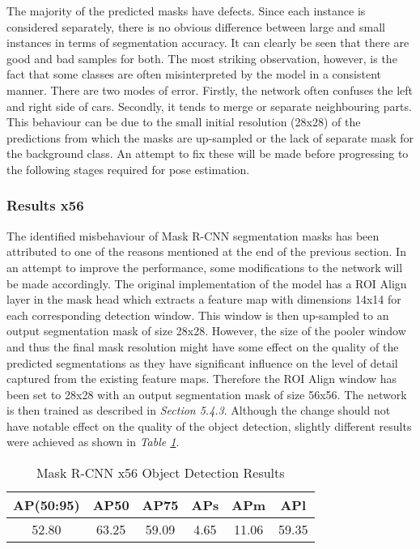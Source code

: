 \documentclass[main.tex]{subfiles}
\begin{document}
\indent The majority of the predicted masks have defects. Since each instance is considered separately, there is no obvious difference between large and small instances in terms of segmentation accuracy. It can clearly be seen that there are good and bad samples for both. The most striking observation, however, is the fact that some classes are often misinterpreted by the model in a consistent manner. There are two modes of error. Firstly, the network often confuses the left and right side of cars. Secondly, it tends to merge or separate neighbouring parts. This behaviour can be due to the small initial resolution (28x28) of the predictions from which the masks are up-sampled or the lack of separate mask for the background class. An attempt to fix these will be made before progressing to the following stages required for pose estimation.
\subsubsection{Results x56}
The identified misbehaviour of Mask R-CNN segmentation masks has been attributed to one of the reasons mentioned at the end of the previous section. In an attempt to improve the performance, some modifications to the network will be made accordingly. The original implementation of the model has a ROI Align layer in the mask head which extracts a feature map with dimensions 14x14 for each corresponding detection window. This window is then up-sampled to an output segmentation mask of size 28x28. However, the size of the pooler window and thus the final mask resolution might have some effect on the quality of the predicted segmentations as they have significant influence on the level of detail captured from the existing feature maps. Therefore the ROI Align window has been set to 28x28 with an output segmentation mask of size 56x56. The network is then trained as described in \emph{Section 5.4.3}. Although the change should not have notable effect on the quality of the object detection, slightly different results were achieved as shown in \emph{Table \ref{tab:mrcnn_obj_resultsx56}}.
\begin{table}[H]
	\centering
	\begin{tabular}{| c | c | c | c | c | c |}
		\hline 
  		AP(50:95) & AP50 & AP75 & APs & APm & APl  \\
  		\hline
   		52.80 & 63.25 & 59.09 & 4.65 & 11.06 & 59.35 \\
		\hline
	\end{tabular}	
\caption{Mask R-CNN x56 Object Detection Results}
\label{tab:mrcnn_obj_resultsx56}
\end{table}
\end{document}
